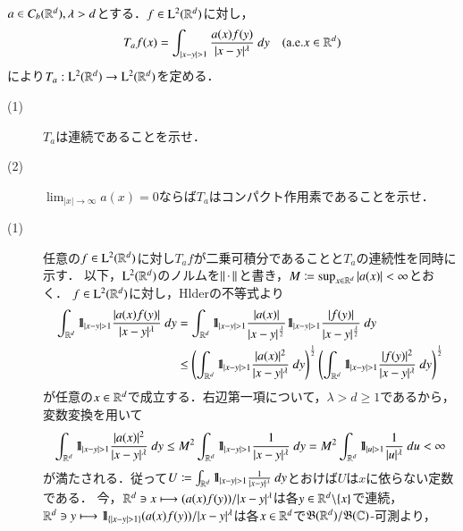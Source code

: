 	\begin{screen}
		[6] $a \in C_b (\mathbb{R}^d), \lambda > d$とする．$f \in \mathrm{L}^2(\mathbb{R}^d)$に対し，
		\begin{align}
			T_a f(x) = \int_{|x - y| > 1} \frac{a(x)f(y)}{|x-y|^\lambda}\ dy
			\quad (\mbox{a.e.}x \in \mathbb{R}^d)
		\end{align}
		により$T_a:\mathrm{L}^2(\mathbb{R}^d) \rightarrow \mathrm{L}^2(\mathbb{R}^d)$を定める．
		\begin{description}
			\item[(1)] $T_a$は連続であることを示せ．
			\item[(2)] $\lim_{|x| \to \infty} a(x) = 0$ならば$T_a$はコンパクト作用素であることを示せ．
		\end{description}
	\end{screen}
	
	\begin{prf}\mbox{}
		\begin{description}
			\item[(1)] 
				任意の$f \in \mathrm{L}^2(\mathbb{R}^d)$に対し$T_a f$が二乗可積分であることと$T_a$の連続性を同時に示す．
				以下，$\mathrm{L}^2(\mathbb{R}^d)$のノルムを$\left\|\, \cdot\, \right\|_{}$と書き，$M \coloneqq \operatorname*{sup}_{x \in \mathbb{R}^d} |a(x)| < \infty$とおく．
				$f \in \mathrm{L}^2(\mathbb{R}^d)$に対し，Hlderの不等式より
				\begin{align}
					\int_{\mathbb{R}^d} \mbox{1}\hspace{-0.25em}\mbox{l}_{|x-y| > 1} \frac{|a(x)f(y)|}{|x-y|^\lambda}\ dy
					&= \int_{\mathbb{R}^d} \mbox{1}\hspace{-0.25em}\mbox{l}_{|x-y| > 1} \frac{|a(x)|}{|x-y|^{\frac{\lambda}{2}}} \mbox{1}\hspace{-0.25em}\mbox{l}_{|x-y| > 1} \frac{|f(y)|}{|x-y|^{\frac{\lambda}{2}}}\ dy \\
					&\leq \left( \int_{\mathbb{R}^d} \mbox{1}\hspace{-0.25em}\mbox{l}_{|x-y| > 1} \frac{|a(x)|^2}{|x-y|^{\lambda}}\ dy \right)^{\frac{1}{2}}
						\left( \int_{\mathbb{R}^d} \mbox{1}\hspace{-0.25em}\mbox{l}_{|x-y| > 1} \frac{|f(y)|^2}{|x-y|^{\lambda}}\ dy \right)^{\frac{1}{2}}
				\end{align}
				が任意の$x \in \mathbb{R}^d$で成立する．右辺第一項について，$\lambda > d \geq 1$であるから，変数変換を用いて
				\begin{align}
					\int_{\mathbb{R}^d} \mbox{1}\hspace{-0.25em}\mbox{l}_{|x-y| > 1} \frac{|a(x)|^2}{|x-y|^{\lambda}}\ dy
					\leq M^2 \int_{\mathbb{R}^d} \mbox{1}\hspace{-0.25em}\mbox{l}_{|x-y| > 1} \frac{1}{|x-y|^{\lambda}}\ dy
					= M^2 \int_{\mathbb{R}^d} \mbox{1}\hspace{-0.25em}\mbox{l}_{|u| > 1} \frac{1}{|u|^\lambda}\ du < \infty
				\end{align}
				が満たされる．従って$U \coloneqq \int_{\R^d} \defunc_{|x - y| > 1} \frac{1}{|x-y|^{\lambda}}\ dy$とおけば$U$は$x$に依らない定数である．
				今，$\mathbb{R}^d \ni x \longmapsto (a(x)f(y))/|x-y|^\lambda$は各$y \in \mathbb{R}^d \backslash \{x\}$で連続，
				$\R^d \ni y \longmapsto \defunc_{\left\{|x-y|>1\right\}}(a(x)f(y))/|x-y|^\lambda$は各$x \in \mathbb{R}^d$で$\mathfrak{B}(\mathbb{R}^d)/\mathfrak{B}(\mathbb{C})$-可測より，

\end{description}
\end{prf}
